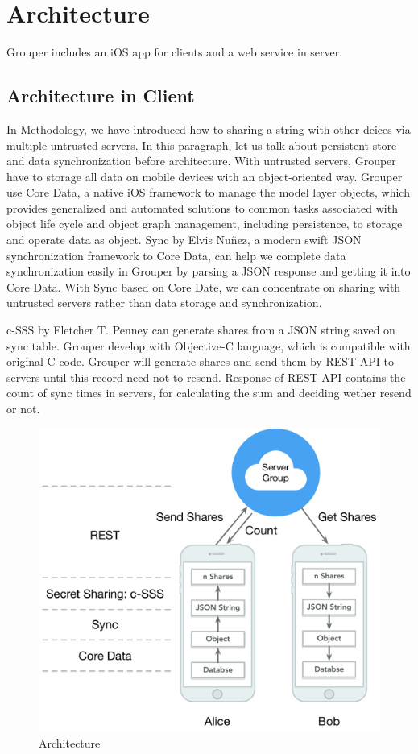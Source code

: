 \documentclass[twocolumn,10pt]{article}
\begin{document}
\section{Architecture}
Grouper includes an iOS app for clients and a web service in server.

\subsection{Architecture in Client}
In Methodology, we have introduced how to sharing a string with other deices via multiple untrusted servers. In this paragraph, let us talk about persistent store and data synchronization before architecture. With untrusted servers, Grouper have to storage all data on mobile devices with an object-oriented way. Grouper use Core Data\cite{coredata}, a native iOS framework to manage the model layer objects, which provides generalized and automated solutions to common tasks associated with object life cycle and object graph management, including persistence, to storage and operate data as object. Sync\cite{sync} by Elvis Nuñez, a modern swift JSON synchronization framework to Core Data, can help we complete data synchronization easily in Grouper by parsing a JSON response and getting it into Core Data. With Sync based on Core Date, we can concentrate on sharing with untrusted servers rather than data storage and synchronization.

c-SSS by Fletcher T. Penney can generate shares from a JSON string saved on sync table. Grouper develop with Objective-C language, which is compatible with original C code. Grouper will generate shares and send them by REST API to servers until this record need not to resend. Response of REST API contains the count of sync times in servers, for calculating the sum and deciding wether resend or not.

\begin{figure}[t]
\centering
\includegraphics[scale=0.4]{architecture}
\caption{Architecture}
\end{figure}
\end{document}
